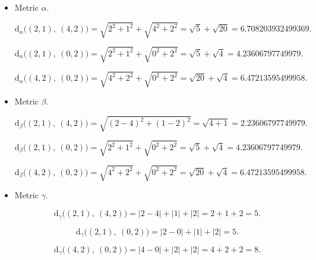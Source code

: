 \documentclass[a4paper,11pt]{article}
\begin{document}
\begin{itemize}
    \item Metric $\alpha$.
        
    \begin{equation*}
        \text{d}_{\alpha} \big( (2, 1), \ (4, 2) \big) = \sqrt{2^2 + 1^2} + \sqrt{4^2 + 2^2} = \sqrt{5} + \sqrt{20} = 6.708203932499369.
    \end{equation*}

    \begin{equation*}
        \text{d}_{\alpha} \big( (2, 1), \ (0, 2) \big) = \sqrt{2^2 + 1^2} + \sqrt{0^2 + 2^2} = \sqrt{5} + \sqrt{4} = 4.23606797749979.
    \end{equation*}

    \begin{equation*}
        \text{d}_{\alpha} \big( (4, 2), \ (0, 2) \big) = \sqrt{4^2 + 2^2} + \sqrt{0^2 + 2^2} = \sqrt{20} + \sqrt{4} = 6.47213595499958.
    \end{equation*}


    \item Metric $\beta$.
    
    \begin{equation*}
        \text{d}_{\beta} \big( (2, 1), \ (4, 2) \big) = \sqrt{(2 - 4)^2 + (1 - 2)^2} = \sqrt{4 + 1} = 2.23606797749979.
    \end{equation*}
        
    \begin{equation*}
        \text{d}_{\beta} \big( (2, 1), \ (0, 2) \big) = \sqrt{2^2 + 1^2} + \sqrt{0^2 + 2^2} = \sqrt{5} + \sqrt{4} = 4.23606797749979.
    \end{equation*}
        
    \begin{equation*}
        \text{d}_{\beta} \big( (4, 2), \ (0, 2) \big) = \sqrt{4^2 + 2^2} + \sqrt{0^2 + 2^2} = \sqrt{20} + \sqrt{4} = 6.47213595499958.
    \end{equation*}


    \item Metric $\gamma$.
    
    \begin{equation*}
        \text{d}_{\gamma} \big( (2, 1), \ (4, 2) \big) = |2 - 4| + |1| + |2| = 2 + 1 + 2 = 5.
    \end{equation*}
        
    \begin{equation*}
        \text{d}_{\gamma} \big( (2, 1), \ (0, 2) \big) = |2 - 0| + |1| + |2| = 5.
    \end{equation*}
        
    \begin{equation*}
        \text{d}_{\gamma} \big( (4, 2), \ (0, 2) \big) = |4 - 0| + |2| + |2| = 4 + 2 + 2 = 8.
    \end{equation*}


\end{itemize}
\end{document}
